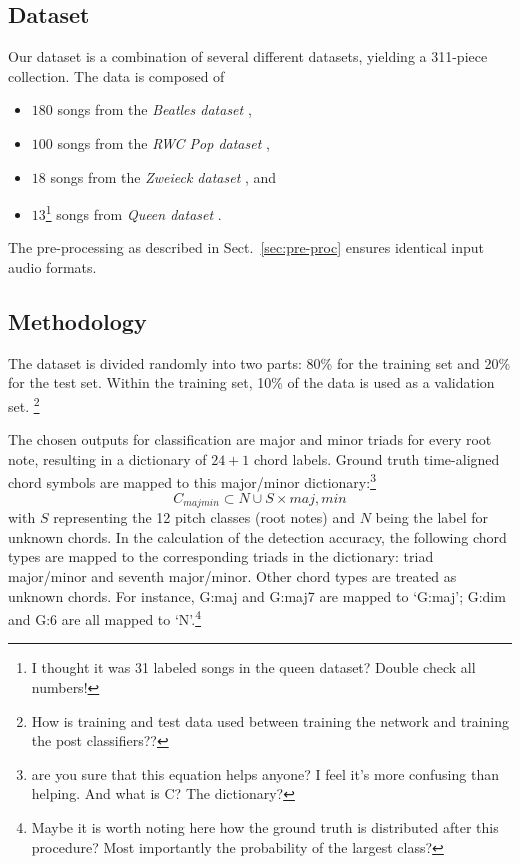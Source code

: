 \documentclass{article}
\begin{document}
\subsection{Dataset}
Our dataset is a combination of several different datasets, yielding a 311-piece collection. The data is composed of 
\begin{itemize}
	\item   $180$ songs from the \textit{Beatles dataset} \cite{},
    \item   $100$ songs from the \textit{RWC Pop dataset} \cite{}, 
    \item   $18$ songs from the \textit{Zweieck dataset} \cite{}, and 
    \item   $13$\footnote{I thought it was 31 labeled songs in the queen dataset? Double check all numbers!} songs from \textit{Queen dataset} \cite{}.
\end{itemize}  
The pre-processing as described in Sect.~\ref{sec:pre-proc} ensures identical input audio formats.

\subsection{Methodology}

The dataset is divided randomly into two parts: 80\% for the training set and 20\% for the test set. Within the training set, 10\% of the data is used as a validation set. \footnote{How is training and test data used between training the network and training the post classifiers??}

The chosen outputs for classification are major and minor triads for every root note, resulting in a dictionary of $24+1$ chord labels.
Ground truth time-aligned chord symbols are mapped to this major/minor dictionary:\footnote{are you sure that this equation helps anyone? I feel it's more confusing than helping. And what is C? The dictionary?}
\begin{equation}
C_{majmin} \subset {N} \cup S \times {maj,min}
\end{equation}
with $S$ representing the 12 pitch classes (root notes) and $N$ being the label for unknown chords. In the calculation of the detection accuracy, the following chord types are mapped to the corresponding triads in the dictionary: triad major/minor and seventh major/minor. Other chord types are treated as unknown chords. For instance, G:maj and G:maj7 are mapped to `G:maj'; G:dim and G:6 are all mapped to `N'.\footnote{Maybe it is worth noting here how the ground truth is distributed after this procedure? Most importantly the probability of the largest class?}
\end{document}
